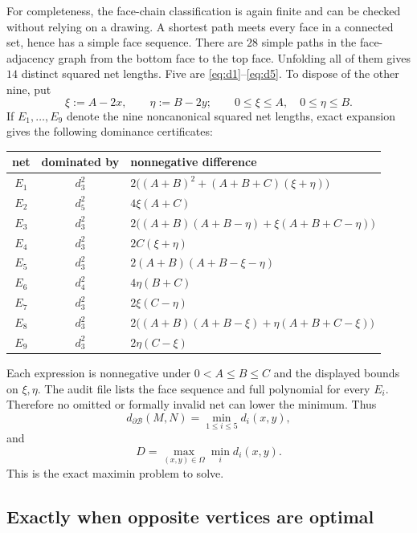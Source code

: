 \documentclass[11pt]{article}
\theoremstyle{definition}
\newcommand{\Surf}{\partial\mathcal B}
\newcommand{\distS}{d_{\Surf}}
\begin{document}
For completeness, the face-chain classification is again finite and can be
checked without relying on a drawing.  A shortest path meets every face in a
connected set, hence has a simple face sequence.  There are $28$ simple paths
in the face-adjacency graph from the bottom face to the top face.  Unfolding
all of them gives $14$ distinct squared net lengths.  Five are
\eqref{eq:d1}--\eqref{eq:d5}.  To dispose of the other nine, put
\[
  \xi:=A-2x,\qquad \eta:=B-2y;
  \qquad 0\le\xi\le A,\quad 0\le\eta\le B.
\]
If $E_1,\ldots,E_9$ denote the nine noncanonical squared net lengths, exact
expansion gives the following dominance certificates:
\begin{center}
\begin{tabular}{ccl}
\toprule
net & dominated by & nonnegative difference\\
\midrule
$E_1$ & $d_3^2$ & $2\bigl((A+B)^2+(A+B+C)(\xi+\eta)\bigr)$\\
$E_2$ & $d_5^2$ & $4\xi(A+C)$\\
$E_3$ & $d_3^2$ & $2\bigl((A+B)(A+B-\eta)+\xi(A+B+C-\eta)\bigr)$\\
$E_4$ & $d_3^2$ & $2C(\xi+\eta)$\\
$E_5$ & $d_3^2$ & $2(A+B)(A+B-\xi-\eta)$\\
$E_6$ & $d_4^2$ & $4\eta(B+C)$\\
$E_7$ & $d_3^2$ & $2\xi(C-\eta)$\\
$E_8$ & $d_3^2$ & $2\bigl((A+B)(A+B-\xi)+\eta(A+B+C-\xi)\bigr)$\\
$E_9$ & $d_3^2$ & $2\eta(C-\xi)$\\
\bottomrule
\end{tabular}
\end{center}
Each expression is nonnegative under $0<A\le B\le C$ and the displayed
bounds on $\xi,\eta$.  The audit file lists the face sequence and full
polynomial for every $E_i$.  Therefore no omitted or formally invalid net can
lower the minimum.  Thus
\begin{equation}\label{eq:five-min}
  \distS(M,N)=\min_{1\le i\le5}d_i(x,y),
\end{equation}
and
\begin{equation}\label{eq:diam-maxmin}
  D=\max_{(x,y)\in\Omega}\min_i d_i(x,y).
\end{equation}
This is the exact maximin problem to solve.

\subsection{Exactly when opposite vertices are optimal}
\end{document}
